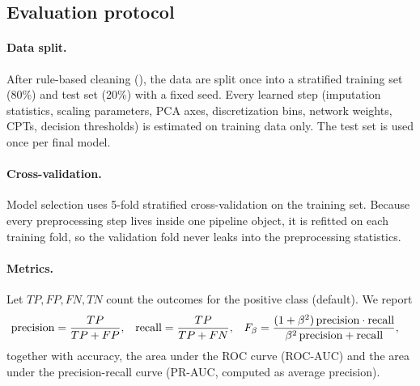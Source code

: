\subsection{Evaluation protocol}
\label{subsec:protocol}

\paragraph{Data split.}
After rule-based cleaning (), the data are split once into a stratified training set (80\%) and test set (20\%) with a fixed seed.
Every learned step (imputation statistics, scaling parameters, PCA axes, discretization bins, network weights, CPTs, decision thresholds) is estimated on training data only.
The test set is used once per final model.

\paragraph{Cross-validation.}
Model selection uses 5-fold stratified cross-validation on the training set.
Because every preprocessing step lives inside one pipeline object, it is refitted on each training fold, so the validation fold never leaks into the preprocessing statistics.

\paragraph{Metrics.}
Let $TP, FP, FN, TN$ count the outcomes for the positive class (default).
We report
\begin{align}
  \text{precision} &= \frac{TP}{TP + FP}, &
  \text{recall} &= \frac{TP}{TP + FN}, &
  F_{\beta} &= \frac{(1 + \beta^2)\,\text{precision}\cdot\text{recall}}{\beta^2\,\text{precision} + \text{recall}},
  \label{eq:fbeta}
\end{align}
together with accuracy, the area under the ROC curve (ROC-AUC) and the area under the precision-recall curve (PR-AUC, computed as average precision).

